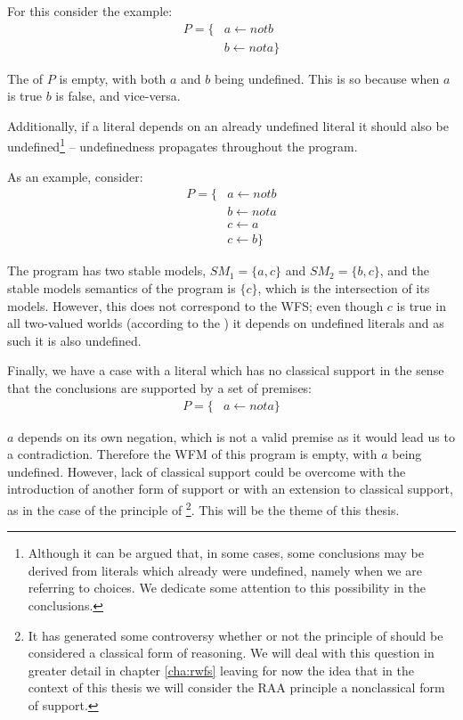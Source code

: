 For this consider the example:
\begin{align*}
P=\{& a \leftarrow not b\\
		& b \leftarrow not a\}
\end{align*}

The \wfm of $P$ is empty, with both $a$ and $b$ being undefined. This is so because when $a$ is true $b$ is false, and vice-versa.

Additionally, if a literal depends on an already undefined literal it should also be undefined\footnote{Although it can be argued that, in some cases, some conclusions may be derived from literals which already were undefined, namely when we are referring to choices. We dedicate some attention to this possibility in the conclusions.} -- undefinedness propagates throughout the program. 

As an example, consider:
\begin{align*}
P=\{& a \leftarrow not b\\
		& b \leftarrow not a\\
		& c \leftarrow a\\
		& c \leftarrow b\}
\end{align*}

The program has two stable models, $SM_{1}=\{a,c\}$ and $SM_{2}=\{b,c\}$, and the stable models semantics of the program is $\{c\}$, which is the intersection of its models. However, this does not correspond to the WFS; even though $c$ is true in all two-valued worlds (according to the \sms) it depends on undefined literals and as such it is also undefined.

Finally, we have a case with a literal which has no classical support in the sense that the conclusions are supported by a set of premises:
\begin{align*}
P=\{& a \leftarrow not a\}
\end{align*}

$a$ depends on its own negation, which is not a valid premise as it would lead us to a contradiction. Therefore the WFM of this program is empty, with $a$ being undefined. However, lack of classical support could be overcome with the introduction of another form of support or with an extension to classical support, as in the case of the principle of \RAA\footnote{It has generated some controversy whether or not the principle of \raa should be considered a classical form of reasoning. We will deal with this question in greater detail in chapter \ref{cha:rwfs} leaving for now the idea that in the context of this thesis we will consider the RAA principle a nonclassical form of support.}. This will be the theme of this thesis.




